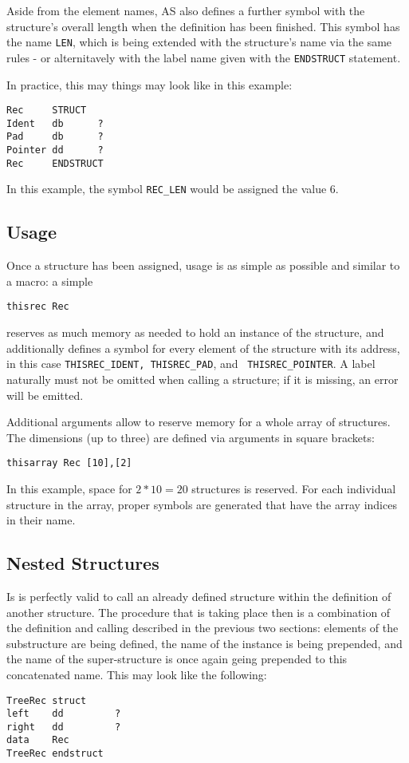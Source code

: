 \documentclass[12pt,twoside]{report}
\newcommand{\tty}[1]{{\tt #1}}
\newcommand{\asname}{{AS}}
\begin{document}
Aside from the element names, \asname{} also defines a further symbol with the
structure's overall length when the definition has been finished.  This
symbol has the name {\tt LEN}, which is being extended with the
structure's name via the same rules - or alternitavely with the label name
given with the \tty{ENDSTRUCT} statement.

In practice, this may things may look like in this example:
\begin{verbatim}
Rec     STRUCT
Ident   db      ?
Pad     db      ?
Pointer dd      ?
Rec     ENDSTRUCT
\end{verbatim}
In this example, the symbol {\tt REC\_LEN} would be assigned the value 6.

\subsection{Usage}

Once a structure has been assigned, usage is as simple as possible and
similar to a macro: a simple
\begin{verbatim}
thisrec Rec
\end{verbatim}
reserves as much memory as needed to hold an instance of the structure,
and additionally defines a symbol for every element of the structure with
its address, in this case {\tt THISREC\_IDENT, THISREC\_PAD}, and {\tt
THISREC\_POINTER}.  A label naturally must not be omitted when calling a
structure; if it is missing, an error will be emitted.

Additional arguments allow to reserve memory for a whole array of structures.
The dimensions (up to three) are defined via arguments in square brackets:
\begin{verbatim}
thisarray Rec [10],[2]
\end{verbatim}
In this example, space for $2*10=20$ structures is reserved. For each individual
structure in the array, proper symbols are generated that have the array
indices in their name.

\subsection{Nested Structures}

Is is perfectly valid to call an already defined structure within the
definition of another structure.  The procedure that is taking place then
is a combination of the definition and calling described in the previous
two sections: elements of the substructure are being defined, the name of
the instance is being prepended, and the name of the super-structure is
once again geing prepended to this concatenated name.  This may look like
the following:
\begin{verbatim}
TreeRec struct
left    dd         ?
right   dd         ?
data    Rec
TreeRec endstruct
\end{verbatim}
\end{document}
